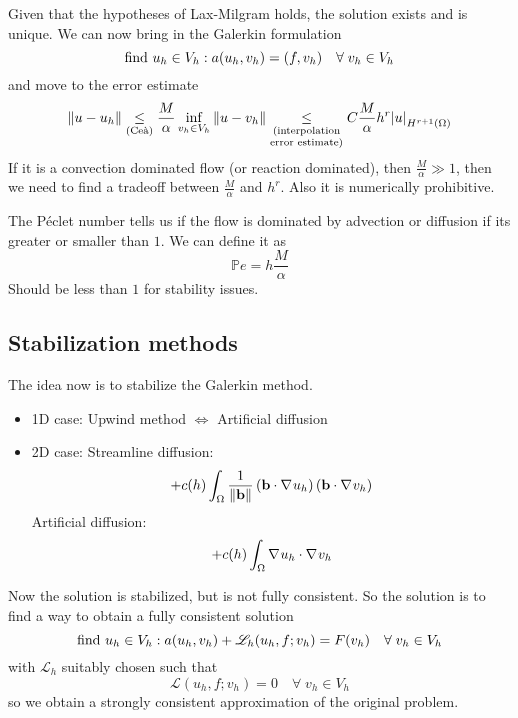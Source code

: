 Given that the hypotheses of Lax-Milgram holds, the solution exists and is unique. We can now bring in the Galerkin formulation
\[
    \text{find } u_h \in V_h : a(u_h, v_h) = (f,v_h) \quad \forall \; v_h \in V_h
\]
and move to the error estimate 
\[
    \norm{u-u_h} \underset{(\text{Ceà})}{\leq} \frac{M}{\alpha} \inf_{v_h \in V_h} \norm{u-v_h} \underset{\substack{(\text{interpolation} \\\text{error estimate})}}{\leq} C \frac{M}{\alpha} h^r \abs{u}_{H^{r+1}(\Omega)}
\]
If it is a convection dominated flow (or reaction dominated), then \(\frac{M}{\alpha} \gg 1\), then we need to find a tradeoff between \(\frac{M}{\alpha}\) and \(h^r\). Also it is numerically prohibitive. 

The Péclet number tells us if the flow is dominated by advection or diffusion if its greater or smaller than \(1\). We can define it as 
\[
    \mathbb{P}e = h\frac{M}{\alpha}
\]
Should be less than \(1\) for stability issues.
\subsection{Stabilization methods}
The idea now is to stabilize the Galerkin method. 
\begin{itemize}
    \item 1D case: Upwind method \(\iff\) Artificial diffusion
    \item 2D case: Streamline diffusion: 
    \[
        +c(h) \int_\Omega \frac{1}{\norm{\textbf{b}}} \left( \textbf{b} \cdot \nabla\mspace{1mu} u_h \right) \left( \textbf{b} \cdot \nabla\mspace{1mu} v_h \right)
    \]
    Artificial diffusion: 
    \[
        +c(h)\int_\Omega \nabla\mspace{1mu} u_h \cdot \nabla\mspace{1mu} v_h 
    \]
\end{itemize}
Now the solution is stabilized, but is not fully consistent. So the solution is to find a way to obtain a fully consistent solution 
\[
    \text{find } u_h \in V_h : a(u_h, v_h) + \mathscr{L}_h (u_h, f; v_h) = F(v_h) \quad \forall \; v_h \in V_h
\]
with \(\mathscr{L}_h\) suitably chosen such that
\[
    \mathscr{L}(u_h, f; v_h) = 0 \quad \forall \; v_h \in V_h
\]
so we obtain a strongly consistent approximation of the original problem.

